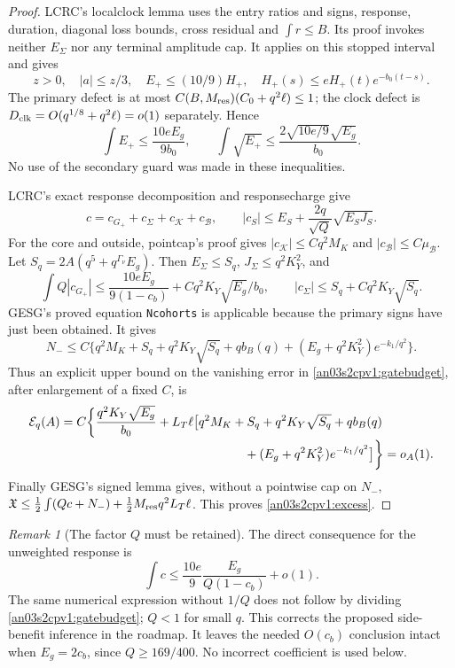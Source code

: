 \documentclass[11pt]{article}
\theoremstyle{remark}\newtheorem{remark}[theorem]{Remark}
\newcommand{\Gp}{G_+}
\newcommand{\KK}{\mathcal K}
\newcommand{\BB}{\mathcal B}
\begin{document}
\begin{proof}
LCRC's localclock lemma uses the entry ratios and signs, response,
duration, diagonal loss bounds, cross residual and $\int r\le B$.
Its proof invokes neither $E_\Sigma$ nor any terminal amplitude
cap. It applies on this stopped interval and gives
\[
 z>0,\quad |a|\le z/3,\quad E_+\le(10/9)H_+,
 \quad H_+(s)\le eH_+(t)e^{-b_0(t-s)}.
\]
The primary defect is at most
$C(B,M_{\rm res})(C_0+q^2\ell)\le1$; the clock defect is
$D_{\rm clk}=O(q^{1/8}+q^2\ell)=o(1)$ separately. Hence
\begin{equation}
 \int E_+\le\frac{10eE_g}{9b_0},\qquad
 \int\sqrt{E_+}\le\frac{2\sqrt{10e/9}\sqrt{E_g}}{b_0}.
 \label{an03s2cpv1:primaryintegrals}
\end{equation}
No use of the secondary guard was made in these inequalities.

LCRC's exact response decomposition and responsecharge give
\[
 c=c_{\Gp}+c_\Sigma+c_{\KK}+c_{\BB},\qquad
 |c_S|\le E_S+\frac{2q}{\sqrt Q}\sqrt{E_SJ_S}.
\]
For the core and outside, pointcap's proof gives
$|c_{\KK}|\le Cq^2M_K$ and $|c_{\BB}|\le C\mu_{\BB}$.
Let $S_q=2A(q^5+q^{\Gamma_\nu}E_g)$. Then
$E_\Sigma\le S_q$, $J_\Sigma\le q^2K_Y^2$, and
\[
 \int Q|c_{\Gp}|\le\frac{10eE_g}{9(1-c_b)}
       +Cq^2K_Y\sqrt{E_g}/b_0,
 \qquad |c_\Sigma|\le S_q+Cq^2K_Y\sqrt{S_q}.
\]
GESG's proved equation \texttt{Ncohorts} is applicable because
the primary signs have just been obtained. It gives
\[
 N_-\le C\{q^2M_K+S_q+q^2K_Y\sqrt{S_q}
       +q b_B(q)+(E_g+q^2K_Y^2)e^{-k_1/q^2}\}.
\]
Thus an explicit upper bound on the vanishing error in
\eqref{an03s2cpv1:gatebudget}, after enlargement of a fixed $C$, is
\begin{align}
 \mathcal E_q(A)=C\bigg\{&\frac{q^2K_Y\sqrt{E_g}}{b_0}
 +L_T\ell\big[q^2M_K+S_q+q^2K_Y\sqrt{S_q}
 +q b_B(q)\nonumber\\[-2pt]
 &\hspace{42mm}+(E_g+q^2K_Y^2)e^{-k_1/q^2}\big]\bigg\}=o_A(1).
 \label{an03s2cpv1:error}
\end{align}
Finally GESG's signed lemma gives, without a pointwise cap on
$N_-$,
$\mathfrak X\le\tfrac12\int(Qc+N_-)
+\tfrac12M_{\rm res}q^2L_T\ell$.
This proves \eqref{an03s2cpv1:excess}.
\end{proof}

\begin{remark}[The factor $Q$ must be retained]
\label{an03s2cpv1:Qcorrection}
The direct consequence for the unweighted response is
\begin{equation}
 \int c\le \frac{10e}{9}\frac{E_g}{Q(1-c_b)}+o(1).
 \label{an03s2cpv1:cbudget}
\end{equation}
The same numerical expression without $1/Q$ does not follow
by dividing \eqref{an03s2cpv1:gatebudget}; $Q<1$ for small $q$.
This corrects the proposed side-benefit inference in the roadmap.
It leaves the needed $O(c_b)$ conclusion intact when $E_g=2c_b$,
since $Q\ge169/400$. No incorrect coefficient is used below.
\end{remark}
\end{document}
